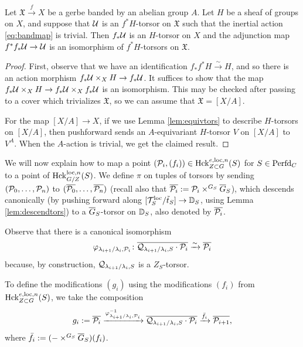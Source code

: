 \begin{lem}\label{lem:descendtors}
    Let $\mathfrak{X} \xrightarrow{f} X$ be a gerbe banded by an abelian group $A$. Let $H$ be a sheaf of groups on $X$, and suppose that $\mathcal{U}$ is an $f^{*}H$-torsor on $\mathfrak{X}$ such that the inertial action \eqref{eq:bandmap} is trivial. Then $f_{*}\mathcal{U}$ is an $H$-torsor on $X$ and the adjunction map $f^{*}f_{*}\mathcal{U} \to \mathcal{U}$ is an isomorphism of $f^{*}H$-torsors on $\mathfrak{X}$.
\end{lem}

\begin{proof}
    First, observe that we have an identification $f_{*}f^{*}H \xrightarrow{\sim} H$, and so there is an action morphism $f_{*}\mathcal{U} \times_{X} H \to f_{*}\mathcal{U}$. It suffices to show that the map $f_{*}\mathcal{U} \times_{X} H \to f_{*}\mathcal{U} \times_{X} f_{*}\mathcal{U}$ is an isomorphism. This may be checked after passing to a cover which trivializes $\mathfrak{X}$, so we can assume that $\mathfrak{X} = [X/A]$.

    For the map $[X/A] \to X$, if we use Lemma \ref{lem:equivtors} to describe $H$-torsors on $[X/A]$, then pushforward sends an $A$-equivariant $H$-torsor $V$ on $[X/A]$ to $V^{A}$. When the $A$-action is trivial, we get the claimed result.
\end{proof}

We will now explain how to map a point $(\mathcal{P}_{i},(f_{i})) \in \textnormal{Hck}^{e,\mathrm{loc},n}_{Z \subset G}(S)$ for $S \in \mathrm{Perfd}_{C}$ to a point of $\mathrm{Hck}_{G/Z}^{\mathrm{loc},n}(S)$. We define $\pi$ on tuples of torsors by sending $(\mathcal{P}_{0}, \dots, \mathcal{P}_{n})$ to $(\overline{\mathcal{P}_{0}}, \dots, \overline{\mathcal{P}_{n}})$ (recall also that $\overline{\mathcal{P}_{i}} := \mathcal{P}_{i} \times^{G_{S}} \overline{G}_{S}$), which descends canonically (by pushing forward along $[\mathcal{T}_{S}^{\mathrm{loc}}/\tilde{t}_{S}] \to \mathbb D_{S}$, using Lemma \ref{lem:descendtors}) to a $\overline{G}_{S}$-torsor on $\mathbb D_{S}$, also denoted by $\overline{\mathcal{P}_{i}}$.

Observe that there is a canonical isomorphism 
\begin{equation}\label{eq:varphi}
   \varphi_{\lambda_{i+1}/\lambda_{i},\mathcal{P}_{i}} \colon \overline{\mathcal{Q}_{\lambda_{i+1}/\lambda_{i},S} \cdot \mathcal{P}_{i}} \xrightarrow{\sim} \overline{\mathcal{P}_{i}}
\end{equation}
because, by construction, $\mathcal{Q}_{\lambda_{i+1}/\lambda_{i},S}$ is a $Z_{S}$-torsor.

To define the modifications $(g_{i})$ using the modifications $(f_{i})$ from $\textnormal{Hck}^{e,\mathrm{loc},n}_{Z \subset G}(S)$, we take the composition 
\begin{equation*}
g_{i}:= \overline{\mathcal{P}_{i}} \xrightarrow{\varphi_{\lambda_{i+1}/\lambda_{i},\mathcal{P}_{i}}^{-1}} \overline{\mathcal{Q}_{\lambda_{i+1}/\lambda_{i},S} \cdot \mathcal{P}_{i}}  \xrightarrow{\bar{f}_{i}} \overline{\mathcal{P}_{i+1}},
\end{equation*}
where $\bar{f}_{i} := (-\times^{G_{S}} \overline{G}_{S})(f_{i})$.


